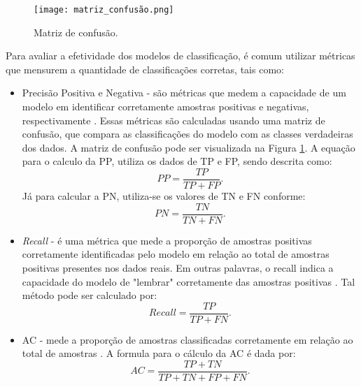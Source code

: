 \begin{figure}[htbp]
    \caption{Matriz de confusão.}
      \centering
      \texttt{[image: matriz\_confusão.png]} 
    \label{fig:matrizconfusao}
\end{figure}

Para avaliar a efetividade dos modelos de classificação, é comum utilizar métricas que mensurem a quantidade de classificações corretas, tais como:
\begin{itemize}   
    \item Precisão Positiva e Negativa - são métricas que medem a capacidade de um modelo em identificar corretamente amostras positivas e negativas, respectivamente \cite{Xiaoci_Predicting}. Essas métricas são calculadas usando uma matriz de confusão, que compara as classificações do modelo com as classes verdadeiras dos dados. A matriz de confusão pode ser visualizada na Figura \ref{fig:matrizconfusao}. A equação para o calculo da \ac{PP}, utiliza os dados de \ac{TP} e \ac{FP}, sendo descrita como: 
    \begin{equation}
        \label{eq:PP}
        PP = \frac{TP}{TP+FP}.
    \end{equation}
    Já para calcular a \ac{PN}, utiliza-se os valores de \ac{TN} e \ac{FN} conforme:
    \begin{equation}
        \label{eq:PN}
        PN = \frac{TN}{TN + FN}.
    \end{equation}

    \item \textit{Recall} - é uma métrica que mede a proporção de amostras positivas corretamente identificadas pelo modelo em relação ao total de amostras positivas presentes nos dados reais. Em outras palavras, o recall indica a capacidade do modelo de "lembrar" corretamente das amostras positivas \cite{ampomah2020evaluation}. Tal método pode ser calculado por: 
    \begin{equation}
        \label{eq:recall}
        Recall = \frac{TP}{TP + FN}.
    \end{equation}
    
    \item \ac{AC} - mede a proporção de amostras classificadas corretamente em relação ao total de amostras \cite{ampomah2020evaluation, Vinícius_Sistemas, lee2021exploring}. A formula para o cálculo da \ac{AC} é dada por:
    \begin{equation}
        \label{AC}
        AC = \frac{TP + TN}{TP + TN + FP + FN}.
    \end{equation}    
\end{itemize}

